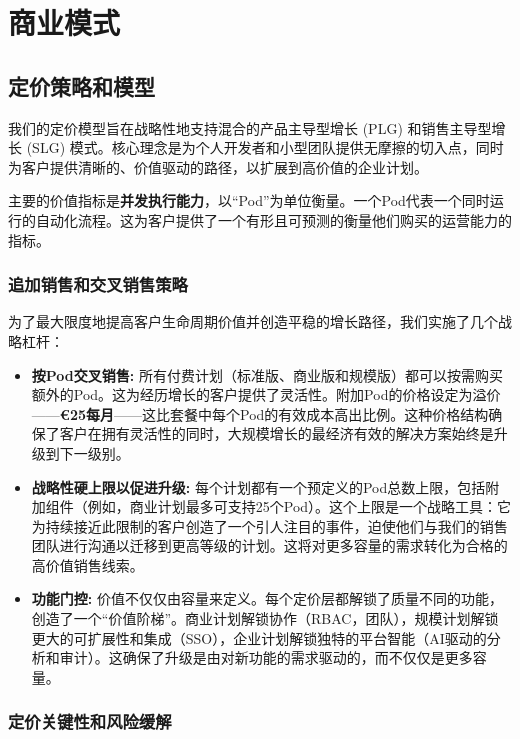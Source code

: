 \documentclass[11pt, a4paper, oneside]{article}
\begin{document}
\section{商业模式}
\subsection{定价策略和模型}
我们的定价模型旨在战略性地支持混合的产品主导型增长 (PLG) 和销售主导型增长 (SLG) 模式。核心理念是为个人开发者和小型团队提供无摩擦的切入点，同时为客户提供清晰的、价值驱动的路径，以扩展到高价值的企业计划。

主要的价值指标是\textbf{并发执行能力}，以“Pod”为单位衡量。一个Pod代表一个同时运行的自动化流程。这为客户提供了一个有形且可预测的衡量他们购买的运营能力的指标。

\subsubsection{追加销售和交叉销售策略}

为了最大限度地提高客户生命周期价值并创造平稳的增长路径，我们实施了几个战略杠杆：

\begin{itemize}
    \item \textbf{按Pod交叉销售:} 所有付费计划（标准版、商业版和规模版）都可以按需购买额外的Pod。这为经历增长的客户提供了灵活性。附加Pod的价格设定为溢价——\textbf{\euro{25}每月}——这比套餐中每个Pod的有效成本高出比例。这种价格结构确保了客户在拥有灵活性的同时，大规模增长的最经济有效的解决方案始终是升级到下一级别。

    \item \textbf{战略性硬上限以促进升级:} 每个计划都有一个预定义的Pod总数上限，包括附加组件（例如，商业计划最多可支持25个Pod）。这个上限是一个战略工具：它为持续接近此限制的客户创造了一个引人注目的事件，迫使他们与我们的销售团队进行沟通以迁移到更高等级的计划。这将对更多容量的需求转化为合格的高价值销售线索。

    \item \textbf{功能门控:} 价值不仅仅由容量来定义。每个定价层都解锁了质量不同的功能，创造了一个“价值阶梯”。商业计划解锁协作（RBAC，团队），规模计划解锁更大的可扩展性和集成（SSO），企业计划解锁独特的平台智能（AI驱动的分析和审计）。这确保了升级是由对新功能的需求驱动的，而不仅仅是更多容量。
\end{itemize}

\subsubsection{定价关键性和风险缓解}
\end{document}
